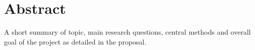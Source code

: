 
\chapter*{Abstract}\label{chp:abstract}

\begin{shaded}
A short summary of topic, main research questions, central methods and overall goal of the project as detailed in the proposal.
\end{shaded}

\lipsum[1]
